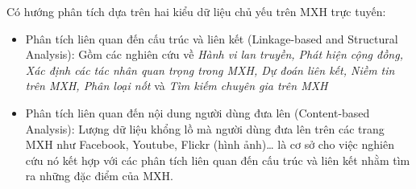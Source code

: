 \documentclass[12pt]{extarticle}
\begin{document}
			\par Có hướng phân tích dựa trên hai kiểu dữ liệu chủ yếu trên MXH trực tuyến:
			\begin{itemize}
				\item{Phân tích liên quan đến cấu trúc và liên kết (Linkage-based and Structural Analysis): Gồm các nghiên cứu về \textit{Hành vi lan truyền, Phát hiện cộng đồng, Xác định các tác nhân quan trọng trong MXH, Dự đoán liên kết, Niềm tin trên MXH, Phân loại nốt} và \textit{Tìm kiếm chuyên gia trên MXH}}	
				\item{Phân tích liên quan đến nội dung người dùng đưa lên (Content-based Analysis): Lượng dữ liệu khổng lồ mà người dùng đưa lên trên các trang MXH như Facebook, Youtube, Flickr (hình ảnh)… là cơ sở cho việc nghiên cứu nó kết hợp với các phân tích liên quan đến cấu trúc và liên kết nhằm tìm ra những đặc điểm của MXH.}
			\end{itemize}
\end{document}

